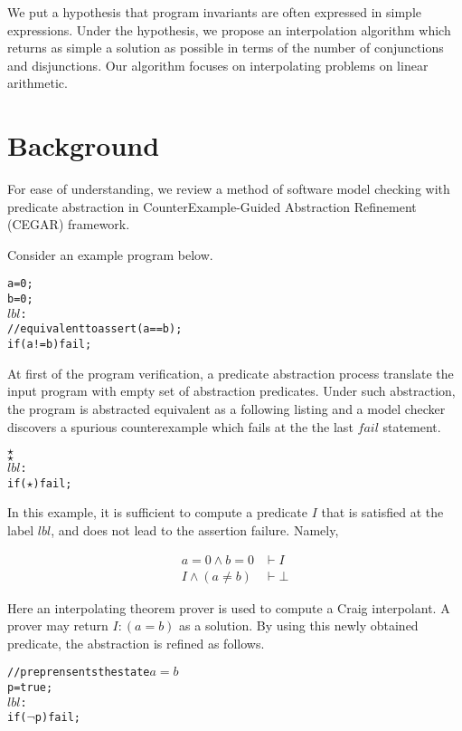 We put a hypothesis that program invariants are often expressed in
simple expressions. Under the hypothesis, we propose an interpolation
algorithm which returns as simple a solution as possible in terms of
the number of conjunctions and disjunctions.  Our algorithm focuses on
interpolating problems on linear arithmetic.


\section{Background}

For ease of understanding, we review a method of software model
checking with predicate abstraction\cite{conf/cav/GrafS97} in
CounterExample-Guided Abstraction Refinement (CEGAR) framework.

Consider an example program below.

\begin{alltt}
    a = 0;
    b = 0;
\(lbl\):
    // equivalent to assert (a == b);
    if (a != b) fail;
\end{alltt}

At first of the program verification, a predicate abstraction process
translate the input program with empty set of abstraction predicates.
Under such abstraction, the program is abstracted equivalent as a
following listing and a model checker discovers a spurious
counterexample which fails at the the last $fail$ statement.

\begin{alltt}
    \(\star\)
    \(\star\)
\(lbl\):
    if (\(\star\)) fail;
\end{alltt}

In this example, it is sufficient to compute a predicate $I$ that is
satisfied at the label $lbl$, and does not lead to the assertion
failure.  Namely,

\begin{align*}
a = 0 \wedge b = 0 & \vdash I \\
I \wedge (a \neq b) & \vdash \bot
\end{align*}

Here an interpolating theorem prover is used to compute a
Craig interpolant.  A prover may return $I: (a = b)$ as a solution.
By using this newly obtained predicate, the abstraction is refined as follows.

\begin{alltt}
    // p reprensents the state \(a=b\)
    p = true;
\(lbl\):
    if (\(\neg\)p) fail;
\end{alltt}

